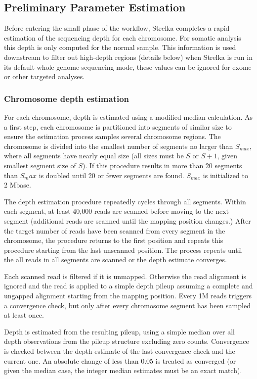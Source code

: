 \documentclass{article}
\begin{document}
\subsection{Preliminary Parameter Estimation}

Before entering the small  phase of the workflow, Strelka completes a rapid estimation of the sequencing depth for each chromosome. For somatic analysis this depth is only computed for the normal sample. This information is used downstream to filter out high-depth regions (details below) when Strelka is run in its default whole genome sequencing mode, these values can be ignored for exome or other targeted analyses.

\subsubsection{Chromosome depth estimation}

For each chromosome, depth is estimated using a modified median calculation. As a first step, each chromosome is partitioned into segments of similar size to ensure the estimation process samples several chromosome regions. The chromosome is divided into the smallest number of segments no larger than $S_{max}$, where all segments have nearly equal size (all sizes must be $S$ or $S+1$, given smallest segment size of $S$). If this procedure results in more than 20 segments than $S_max$ is doubled until 20 or fewer segments are found. $S_{max}$ is initialized to 2 Mbase.

The depth estimation procedure repeatedly cycles through all segments. Within each segment, at least 40,000 reads are scanned before moving to the next segment (additional reads are scanned until the mapping position changes.) After the target number of reads have been scanned from every segment in the chromosome, the procedure returns to the first position and repeats this procedure starting from the last unscanned position. The process repeats until the all reads in all segments are scanned or the depth estimate converges.

Each scanned read is filtered if it is unmapped. Otherwise the read alignment is ignored and the read is applied to a simple depth pileup assuming a complete and ungapped alignment starting from the mapping position. Every 1M reads triggers a convergence check, but only after every chromosome segment has been sampled at least once.

Depth is estimated from the resulting pileup, using a simple median over all depth observations from the pileup structure excluding zero counts. Convergence is checked between the depth estimate of the last convergence check and the current one. An absolute change of less than 0.05 is treated as converged (or given the median case, the integer median estimates must be an exact match).
\end{document}
